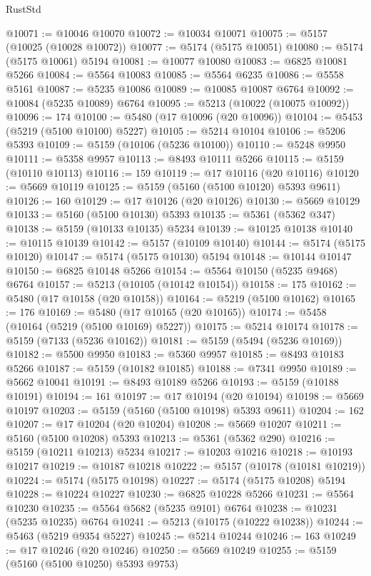 \begin{lexlean}{RustStd}
\begin{coremodule}
@10071 := @10046 @10070
@10072 := @10034 @10071
@10075 := @5157 (@10025 (@10028 @10072))
@10077 := @5174 (@5175 @10051)
@10080 := @5174 (@5175 @10061) @5194
@10081 := @10077 @10080
@10083 := @6825 @10081 @5266
@10084 := @5564 @10083
@10085 := @5564 @6235
@10086 := @5558 @5161
@10087 := @5235 @10086
@10089 := @10085 @10087 @6764
@10092 := @10084 (@5235 @10089) @6764
@10095 := @5213 (@10022 (@10075 @10092))
@10096 := 174
@10100 := @5480 (@17 @10096 (@20 @10096))
@10104 := @5453 (@5219 (@5100 @10100) @5227)
@10105 := @5214 @10104
@10106 := @5206 @5393
@10109 := @5159 (@10106 (@5236 @10100))
@10110 := @5248 @9950
@10111 := @5358 @9957
@10113 := @8493 @10111 @5266
@10115 := @5159 (@10110 @10113)
@10116 := 159
@10119 := @17 @10116 (@20 @10116)
@10120 := @5669 @10119
@10125 := @5159 (@5160 (@5100 @10120) @5393 @9611)
@10126 := 160
@10129 := @17 @10126 (@20 @10126)
@10130 := @5669 @10129
@10133 := @5160 (@5100 @10130) @5393
@10135 := @5361 (@5362 @347)
@10138 := @5159 (@10133 @10135) @5234
@10139 := @10125 @10138
@10140 := @10115 @10139
@10142 := @5157 (@10109 @10140)
@10144 := @5174 (@5175 @10120)
@10147 := @5174 (@5175 @10130) @5194
@10148 := @10144 @10147
@10150 := @6825 @10148 @5266
@10154 := @5564 @10150 (@5235 @9468) @6764
@10157 := @5213 (@10105 (@10142 @10154))
@10158 := 175
@10162 := @5480 (@17 @10158 (@20 @10158))
@10164 := @5219 (@5100 @10162)
@10165 := 176
@10169 := @5480 (@17 @10165 (@20 @10165))
@10174 := @5458 (@10164 (@5219 (@5100 @10169) @5227))
@10175 := @5214 @10174
@10178 := @5159 (@7133 (@5236 @10162))
@10181 := @5159 (@5494 (@5236 @10169))
@10182 := @5500 @9950
@10183 := @5360 @9957
@10185 := @8493 @10183 @5266
@10187 := @5159 (@10182 @10185)
@10188 := @7341 @9950
@10189 := @5662 @10041
@10191 := @8493 @10189 @5266
@10193 := @5159 (@10188 @10191)
@10194 := 161
@10197 := @17 @10194 (@20 @10194)
@10198 := @5669 @10197
@10203 := @5159 (@5160 (@5100 @10198) @5393 @9611)
@10204 := 162
@10207 := @17 @10204 (@20 @10204)
@10208 := @5669 @10207
@10211 := @5160 (@5100 @10208) @5393
@10213 := @5361 (@5362 @290)
@10216 := @5159 (@10211 @10213) @5234
@10217 := @10203 @10216
@10218 := @10193 @10217
@10219 := @10187 @10218
@10222 := @5157 (@10178 (@10181 @10219))
@10224 := @5174 (@5175 @10198)
@10227 := @5174 (@5175 @10208) @5194
@10228 := @10224 @10227
@10230 := @6825 @10228 @5266
@10231 := @5564 @10230
@10235 := @5564 @5682 (@5235 @9101) @6764
@10238 := @10231 (@5235 @10235) @6764
@10241 := @5213 (@10175 (@10222 @10238))
@10244 := @5463 (@5219 @9354 @5227)
@10245 := @5214 @10244
@10246 := 163
@10249 := @17 @10246 (@20 @10246)
@10250 := @5669 @10249
@10255 := @5159 (@5160 (@5100 @10250) @5393 @9753)

\end{coremodule}
\end{lexlean}
